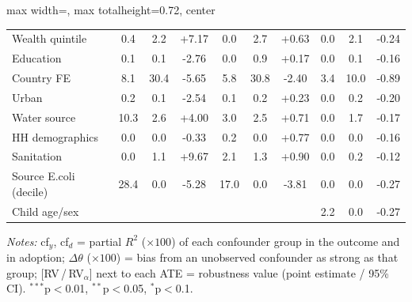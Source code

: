 \begin{landscape}
\begin{table}[htbp]
\begin{adjustbox}{max width=\linewidth, max totalheight=0.72\textwidth, center}
\begin{tabular}{l|ccc|ccc|ccc}
\quad Wealth quintile & 0.4 & 2.2 & +7.17 & 0.0 & 2.7 & +0.63 & 0.0 & 2.1 & -0.24 \\
\quad Education & 0.1 & 0.1 & -2.76 & 0.0 & 0.9 & +0.17 & 0.0 & 0.1 & -0.16 \\
\quad Country FE & 8.1 & 30.4 & -5.65 & 5.8 & 30.8 & -2.40 & 3.4 & 10.0 & -0.89 \\
\quad Urban & 0.2 & 0.1 & -2.54 & 0.1 & 0.2 & +0.23 & 0.0 & 0.2 & -0.20 \\
\quad Water source & 10.3 & 2.6 & +4.00 & 3.0 & 2.5 & +0.71 & 0.0 & 1.7 & -0.17 \\
\quad HH demographics & 0.0 & 0.0 & -0.33 & 0.2 & 0.0 & +0.77 & 0.0 & 0.0 & -0.16 \\
\quad Sanitation & 0.0 & 1.1 & +9.67 & 2.1 & 1.3 & +0.90 & 0.0 & 0.2 & -0.12 \\
\quad Source E.coli (decile) & 28.4 & 0.0 & -5.28 & 17.0 & 0.0 & -3.81 & 0.0 & 0.0 & -0.27 \\
\quad Child age/sex &  &  &  &  &  &  & 2.2 & 0.0 & -0.27 \\
\bottomrule
\end{tabular}
\end{adjustbox}
\par\vspace{3pt}
\begin{minipage}{\linewidth}\footnotesize \textit{Notes:} cf$_y$, cf$_d$ = partial $R^2$ ($\times100$) of each confounder group in the outcome and in adoption; $\Delta\theta$ ($\times100$) = bias from an unobserved confounder as strong as that group; [RV\,/\,RV$_\alpha$] next to each ATE = robustness value (point estimate / 95\% CI). $^{***}$p$<$0.01, $^{**}$p$<$0.05, $^{*}$p$<$0.1.\end{minipage}
\end{table}
\end{landscape}